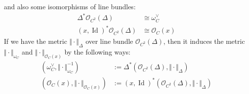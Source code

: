 \documentclass[reqno,11pt]{amsart}
\numberwithin{equation}{section}
\theoremstyle{plain}
\theoremstyle{plain}
\numberwithin{equation}{section}
\theoremstyle{remark}
\DeclareMathOperator{\Id}{\operatorname{Id}}
\newcommand{\norm}[1]{\Vert{#1}\Vert}
\begin{document}
\begin{figure}[th]
	\begin{minipage}[t]{.48\textwidth}
		\centering
		\label{fig1}
	\end{minipage}
	\begin{minipage}[t]{.48\textwidth}
		\centering
		\label{fig2}
	\end{minipage}
\end{figure}
and also some isomorphisms of line bundles:
\begin{equation*}
\begin{aligned}
  \Delta^* \mathcal{O}_{C^2}(\Delta)&\cong \omega_C^{\vee}  \\
  (x,\Id)^* \mathcal{O}_{C^2}(\Delta)&\cong \mathcal{O}_C(x)
\end{aligned}
\end{equation*}
If we have the metric $\norm{\cdot}_{\Delta}$ over line bundle $\mathcal{O}_{C^2}(\Delta)$, then it induces the metric $\norm{\cdot}_{\omega_C}$ and $\norm{\cdot}_{\mathcal{O}_C(x)}$ by the following ways:
\begin{equation*}
\begin{aligned}
 (\omega_C^{\vee},\norm{\cdot}_{\omega_C}^{-1}) &:= \Delta^* (\mathcal{O}_{C^2}(\Delta), \norm{\cdot}_{\Delta}) \\ 
 (\mathcal{O}_C(x),\norm{\cdot}_{\mathcal{O}_C(x)}) &:= (x,\Id)^* (\mathcal{O}_{C^2}(\Delta), \norm{\cdot}_{\Delta}) \\ 
\end{aligned}
\end{equation*}
\end{document}

